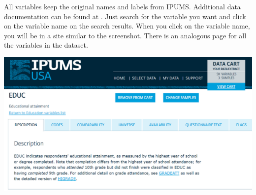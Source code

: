 \documentclass[a4paper, 11pt,addpoints,answers]{exam}
\begin{document}
	All variables keep the original names and labels from IPUMS.  Additional data documentation can be found at . Just search for the variable you want and click on the variable name on the search results. When you click on the variable name, you will be in a site similar to the screenshot. There is  an analogous page for all the variables in the dataset.
	
	\includegraphics[width=.9\textwidth]{screenshot_educ.png}
\eitem 
\newpage
\end{document}
